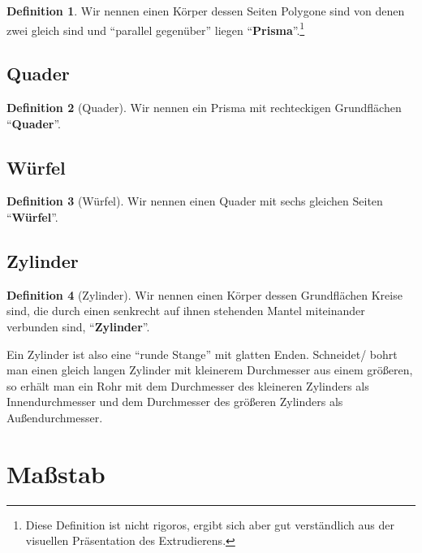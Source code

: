 \documentclass[a4paper]{book}%
\theoremstyle{definition}
\newtheorem{definition}{Definition}
\begin{document}
\begin{definition}
    Wir nennen einen Körper dessen Seiten Polygone sind von denen zwei gleich sind und \enquote{parallel gegenüber} liegen \enquote{\textbf{Prisma}}.\footnote{Diese Definition ist nicht rigoros, ergibt sich aber gut verständlich aus der visuellen Präsentation des Extrudierens.}
\end{definition}


\subsection{Quader}\label{Quader}

\begin{definition}[Quader]
    Wir nennen ein Prisma mit rechteckigen Grundflächen \enquote{\textbf{Quader}}.
\end{definition}

\subsection{Würfel}\label{Würfel}

\begin{definition}[Würfel]
    Wir nennen einen Quader mit sechs gleichen Seiten \enquote{\textbf{Würfel}}.
\end{definition}


\subsection{Zylinder}\label{Zylinder}

\begin{definition}[Zylinder]
    Wir nennen einen Körper dessen Grundflächen Kreise sind, die durch einen senkrecht auf ihnen stehenden Mantel miteinander verbunden sind, \enquote{\textbf{Zylinder}}.
\end{definition}

Ein Zylinder ist also eine \enquote{runde Stange} mit glatten Enden. Schneidet/ bohrt man einen gleich langen Zylinder mit kleinerem Durchmesser aus einem größeren, so erhält man ein Rohr mit dem Durchmesser des kleineren Zylinders als Innendurchmesser und dem Durchmesser des größeren Zylinders als Außendurchmesser.


\section{Maßstab}\label{Maßstab}
\end{document}
